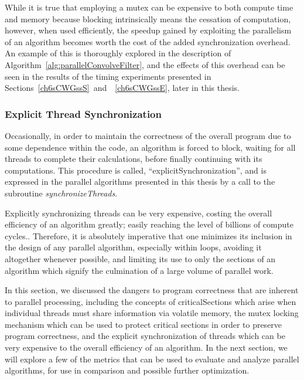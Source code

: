 While it is true that employing a mutex can be expensive to both compute time and memory because blocking intrinsically means the cessation of computation, however, when used efficiently, the speedup gained by exploiting the parallelism of an algorithm becomes worth the cost of the added synchronization overhead.~\cite[~p.20]{Lang17} An example of this is thoroughly explored in the description of Algorithm~\ref{alg:parallelConvolveFilter}, and the effects of this overhead can be seen in the results of the timing experiments presented in Sections~\ref{ch6sCWGssS}~and~~\ref{ch6sCWGssE}, later in this thesis.

%
%
\subsubsection{Explicit Thread Synchronization}
\label{ch2sPPssPCsssETS}
Occasionally, in order to maintain the correctness of the overall program due to some dependence within the code, an algorithm is forced to block, waiting for all threads to complete their calculations, before finally continuing with its computations. This procedure is called, ``\gls{explicitSynchronization}'', and is expressed in the parallel algorithms presented in this thesis by a call to the subroutine \textit{synchronizeThreads}.

Explicitly synchronizing threads can be very expensive, costing the overall efficiency of an algorithm greatly; easily reaching the level of billions of compute cycles.. Therefore, it is absolutely imperative that one minimizes its inclusion in the design of any parallel algorithm, especially within loops, avoiding it altogether whenever possible, and limiting its use to only the sections of an algorithm which signify the culmination of a large volume of parallel work.

In this section, we discussed the dangers to program correctness that are inherent to parallel processing, including the concepts of \glspl{criticalSection} which arise when individual threads must share information via volatile memory, the mutex locking mechanism which can be used to protect critical sections in order to preserve program correctness, and the explicit synchronization of threads which can be very expensive to the overall efficiency of an algorithm. In the next section, we will explore a few of the metrics that can be used to evaluate and analyze parallel algorithms, for use in comparison and possible further optimization. 

